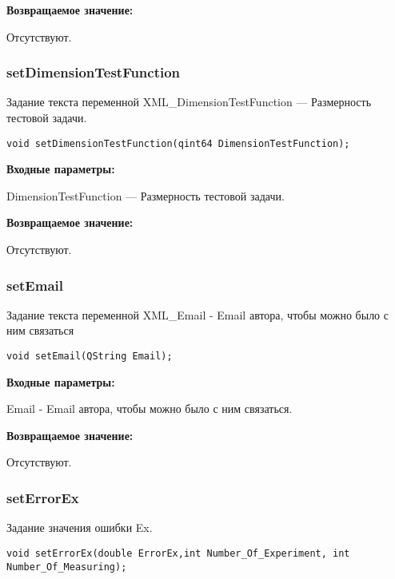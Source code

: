 \documentclass[a4paper,12pt]{article}
\begin{document}
\textbf{Возвращаемое значение:}

Отсутствуют.


\subsubsection{setDimensionTestFunction}\label{setDimensionTestFunction}

Задание текста переменной  XML\_DimensionTestFunction --- Размерность тестовой задачи.


\begin{lstlisting}[label=code_syntax_setDimensionTestFunction,caption=Синтаксис]
void setDimensionTestFunction(qint64 DimensionTestFunction);
\end{lstlisting}

\textbf{Входные параметры:}

DimensionTestFunction --- Размерность тестовой задачи.

\textbf{Возвращаемое значение:}

Отсутствуют.


\subsubsection{setEmail}\label{setEmail}

Задание текста переменной  XML\_Email - Email автора, чтобы можно было с ним связаться


\begin{lstlisting}[label=code_syntax_setEmail,caption=Синтаксис]
void setEmail(QString Email);
\end{lstlisting}

\textbf{Входные параметры:}

Email - Email автора, чтобы можно было с ним связаться.

\textbf{Возвращаемое значение:}

Отсутствуют.


\subsubsection{setErrorEx}\label{setErrorEx}

Задание значения ошибки Ex.


\begin{lstlisting}[label=code_syntax_setErrorEx,caption=Синтаксис]
void setErrorEx(double ErrorEx,int Number_Of_Experiment, int Number_Of_Measuring);
\end{lstlisting}
\end{document}
